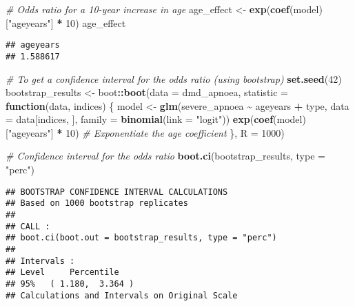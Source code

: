 \documentclass[
]{article}
\newenvironment{Shaded}{\begin{snugshade}}{\end{snugshade}}
\newcommand{\AttributeTok}[1]{\textcolor[rgb]{0.13,0.29,0.53}{#1}}
\newcommand{\CommentTok}[1]{\textcolor[rgb]{0.56,0.35,0.01}{\textit{#1}}}
\newcommand{\ControlFlowTok}[1]{\textcolor[rgb]{0.13,0.29,0.53}{\textbf{#1}}}
\newcommand{\DecValTok}[1]{\textcolor[rgb]{0.00,0.00,0.81}{#1}}
\newcommand{\FunctionTok}[1]{\textcolor[rgb]{0.13,0.29,0.53}{\textbf{#1}}}
\newcommand{\NormalTok}[1]{#1}
\newcommand{\OtherTok}[1]{\textcolor[rgb]{0.56,0.35,0.01}{#1}}
\newcommand{\SpecialCharTok}[1]{\textcolor[rgb]{0.81,0.36,0.00}{\textbf{#1}}}
\newcommand{\StringTok}[1]{\textcolor[rgb]{0.31,0.60,0.02}{#1}}
\begin{document}
\begin{Shaded}
\begin{Highlighting}[]
\CommentTok{\# Odds ratio for a 10{-}year increase in age}
\NormalTok{age\_effect }\OtherTok{\textless{}{-}} \FunctionTok{exp}\NormalTok{(}\FunctionTok{coef}\NormalTok{(model)[}\StringTok{"ageyears"}\NormalTok{] }\SpecialCharTok{*} \DecValTok{10}\NormalTok{)}
\NormalTok{age\_effect}
\end{Highlighting}
\end{Shaded}

\begin{verbatim}
## ageyears 
## 1.588617
\end{verbatim}

\begin{Shaded}
\begin{Highlighting}[]
\CommentTok{\# To get a confidence interval for the odds ratio (using bootstrap)}
\FunctionTok{set.seed}\NormalTok{(}\DecValTok{42}\NormalTok{)}
\NormalTok{bootstrap\_results }\OtherTok{\textless{}{-}}\NormalTok{ boot}\SpecialCharTok{::}\FunctionTok{boot}\NormalTok{(}\AttributeTok{data =}\NormalTok{ dmd\_apnoea, }
                                \AttributeTok{statistic =} \ControlFlowTok{function}\NormalTok{(data, indices) \{}
\NormalTok{                                  model }\OtherTok{\textless{}{-}} \FunctionTok{glm}\NormalTok{(severe\_apnoea }\SpecialCharTok{\textasciitilde{}}\NormalTok{ ageyears }\SpecialCharTok{+}\NormalTok{ type, }
                                               \AttributeTok{data =}\NormalTok{ data[indices, ], }
                                               \AttributeTok{family =} \FunctionTok{binomial}\NormalTok{(}\AttributeTok{link =} \StringTok{"logit"}\NormalTok{))}
                                  \FunctionTok{exp}\NormalTok{(}\FunctionTok{coef}\NormalTok{(model)[}\StringTok{"ageyears"}\NormalTok{] }\SpecialCharTok{*} \DecValTok{10}\NormalTok{)  }\CommentTok{\# Exponentiate the age coefficient}
\NormalTok{                                \},}
                                \AttributeTok{R =} \DecValTok{1000}\NormalTok{)}

\CommentTok{\# Confidence interval for the odds ratio}
\FunctionTok{boot.ci}\NormalTok{(bootstrap\_results, }\AttributeTok{type =} \StringTok{"perc"}\NormalTok{)}
\end{Highlighting}
\end{Shaded}

\begin{verbatim}
## BOOTSTRAP CONFIDENCE INTERVAL CALCULATIONS
## Based on 1000 bootstrap replicates
## 
## CALL : 
## boot.ci(boot.out = bootstrap_results, type = "perc")
## 
## Intervals : 
## Level     Percentile     
## 95%   ( 1.180,  3.364 )  
## Calculations and Intervals on Original Scale
\end{verbatim}
\end{document}
